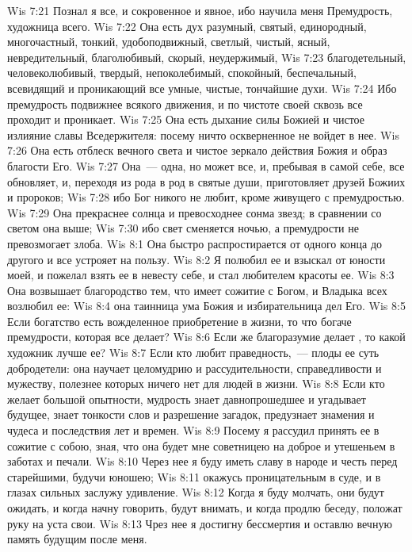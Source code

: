 \vs Wis 7:21 Познал я все, и сокровенное и явное, ибо научила меня Премудрость, художница всего.
\vs Wis 7:22 Она есть дух разумный, святый, единородный, многочастный, тонкий, удобоподвижный, светлый, чистый, ясный, невредительный, благолюбивый, скорый, неудержимый,
\vs Wis 7:23 благодетельный, человеколюбивый, твердый, непоколебимый, спокойный, беспечальный, всевидящий и проникающий все умные, чистые, тончайшие духи.
\vs Wis 7:24 Ибо премудрость подвижнее всякого движения, и по чистоте своей сквозь все проходит и проникает.
\vs Wis 7:25 Она есть дыхание силы Божией и чистое излияние славы Вседержителя: посему ничто оскверненное не войдет в нее.
\vs Wis 7:26 Она есть отблеск вечного света и чистое зеркало действия Божия и образ благости Его.
\vs Wis 7:27 Она~--- одна, но может все, и, пребывая в самой себе, все обновляет, и, переходя из рода в род в святые души, приготовляет друзей Божиих и пророков;
\vs Wis 7:28 ибо Бог никого не любит, кроме живущего с премудростью.
\vs Wis 7:29 Она прекраснее солнца и превосходнее сонма звезд; в сравнении со светом она выше;
\vs Wis 7:30 ибо свет сменяется ночью, а премудрости не превозмогает злоба.
\vs Wis 8:1 Она быстро распростирается от одного конца до другого и все устрояет на пользу.
\vs Wis 8:2 Я полюбил ее и взыскал от юности моей, и пожелал взять ее в невесту себе, и стал любителем красоты ее.
\vs Wis 8:3 Она возвышает  благородство тем, что имеет сожитие с Богом, и Владыка всех возлюбил ее:
\vs Wis 8:4 она таинница ума Божия и избирательница дел Его.
\vs Wis 8:5 Если богатство есть вожделенное приобретение в жизни, то что богаче премудрости, которая все делает?
\vs Wis 8:6 Если же благоразумие делает , то какой художник лучше ее?
\vs Wis 8:7 Если кто любит праведность,~--- плоды ее суть добродетели: она научает целомудрию и рассудительности, справедливости и мужеству, полезнее которых ничего нет для людей в жизни.
\vs Wis 8:8 Если кто желает большой опытности, мудрость знает давнопрошедшее и угадывает будущее, знает тонкости слов и разрешение загадок, предузнает знамения и чудеса и последствия лет и времен.
\vs Wis 8:9 Посему я рассудил принять ее в сожитие с собою, зная, что она будет мне советницею на доброе и утешеньем в заботах и печали.
\vs Wis 8:10 Через нее я буду иметь славу в народе и честь перед старейшими, будучи юношею;
\vs Wis 8:11 окажусь проницательным в суде, и в глазах сильных заслужу удивление.
\vs Wis 8:12 Когда я буду молчать, они будут ожидать, и когда начну говорить, будут внимать, и когда продлю беседу, положат руку на уста свои.
\vs Wis 8:13 Чрез нее я достигну бессмертия и оставлю вечную память будущим после меня.
